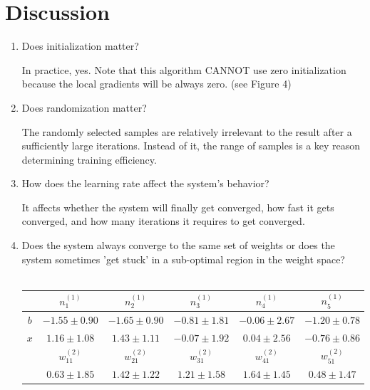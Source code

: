 \documentclass[12pt]{article}
\begin{document}
\newpage
\section*{Discussion}
\vspace{-20pt}
\noindent\makebox[\linewidth]{\rule{\textwidth}{0.4pt}}

\begin{enumerate}
	\item Does initialization matter?
		\begin{flushleft}
			In practice, yes. Note that this algorithm CANNOT use zero initialization because the local gradients will be always zero. (see Figure 4)
		\end{flushleft}
	\item Does randomization matter?
		\begin{flushleft}
			The randomly selected samples are relatively irrelevant to the result after a sufficiently large iterations. Instead of it, the range of samples 
			is a key reason determining training efficiency.
		\end{flushleft}
	\item How does the learning rate affect the system's behavior?
		\begin{flushleft}
			It affects whether the system will finally get converged, how fast it gets converged, and how many iterations it requires to get converged.
		\end{flushleft}
	\item Does the system always converge to the same set of weights or does the system sometimes 'get stuck' in a sub-optimal region 
		in the weight space? \\ \makebox{} \\
			\hspace*{-6em}
			\begin{tabular}{|c|c|c|c|c|c|}
				\hline
				 & $n^{(1)}_1$ & $n^{(1)}_2$ & $n^{(1)}_3$ & $n^{(1)}_4$ & $n^{(1)}_5$ \\
				\hline
				$b$ & $-1.55 \pm 0.90$ & $-1.65 \pm 0.90$ & $-0.81 \pm 1.81$ & $-0.06 \pm 2.67$ & $-1.20 \pm 0.78$ \\
				\hline
				$x$ & $1.16 \pm 1.08$ & $1.43 \pm 1.11$ & $-0.07 \pm 1.92$ & $0.04 \pm 2.56$ & $-0.76 \pm 0.86$ \\
				\hline
				 & $w^{(2)}_{11}$ & $w^{(2)}_{21}$ & $w^{(2)}_{31}$ & $w^{(2)}_{41}$ & $w^{(2)}_{51}$ \\
				\hline
				 & $0.63 \pm 1.85$ & $1.42 \pm 1.22$ & $1.21 \pm 1.58$ & $1.64 \pm 1.45$ & $0.48 \pm 1.47$ \\

\end{tabular}
\end{enumerate}
\end{document}
